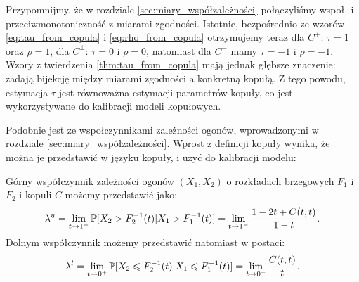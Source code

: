 Przypomnijmy, że w rozdziale \ref{sec:miary_współzależności} połączyliśmy wspoł- i przeciwmonotoniczność z miarami zgodności. Istotnie, bezpośrednio ze wzorów \ref{eq:tau_from_copula} i \ref{eq:rho_from_copula} otrzymujemy teraz dla $C^{+}$: $\tau=1$ oraz $\rho=1$, dla $C^{\perp}$: $\tau=0$ i $\rho=0$, natomiast dla $C^{-}$ mamy $\tau=-1$ i $\rho=-1$. Wzory z twierdzenia \ref{thm:tau_from_copula} mają jednak głębsze znaczenie: zadają bijekcję między miarami zgodności a konkretną kopułą. Z tego powodu, estymacja $\tau$ jest równoważna estymacji parametrów kopuły, co jest wykorzystywane do kalibracji modeli kopułowych.

Podobnie jest ze wspołczynnikami zależności ogonów, wprowadzonymi w rozdziale \ref{sec:miary_współzależności}. Wprost z definicji kopuły wynika, że można je przedstawić w języku kopuły, i uzyć do kalibracji modelu:
\begin{prop}
		Górny współczynnik zależności ogonów $(X_1, X_2)$ o rozkładach brzegowych $F_1$ i $F_2$ i kopuli $C$ możemy przedstawić jako:
		$$ \lambda^{u} = \lim\limits_{t\to1^{-}}\mathbb{P}[X_2 > F_2^{-1}(t) \vert X_1 > F_1^{-1}(t) ] = \lim\limits_{t\to1^{-}}\frac{1-2t+C(t, t)}{1-t}.$$
		Dolnym współczynnik możemy przedstawić natomiast w postaci:
		$$ \lambda^{l} = \lim\limits_{t\to0^{+}}\mathbb{P}[X_2 \leqslant F_2^{-1}(t) \vert X_1 \leqslant F_1^{-1}(t) ] = \lim\limits_{t\to0^{+}}\frac{C(t, t)}{t}.$$
\end{prop}